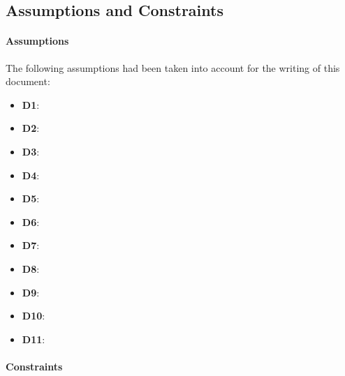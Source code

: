 \subsection{Assumptions and Constraints}

\paragraph{Assumptions}
\newcommand{\DI}{\textbf{D1}: }
\newcommand{\DII}{\textbf{D2}: }
\newcommand{\DIII}{\textbf{D3}: }
\newcommand{\DIV}{\textbf{D4}: }
\newcommand{\DV}{\textbf{D5}: }
\newcommand{\DVI}{\textbf{D6}: }
\newcommand{\DVII}{\textbf{D7}: }
\newcommand{\DVIII}{\textbf{D8}: }
\newcommand{\DIX}{\textbf{D9}: }
\newcommand{\DX}{\textbf{D10}: }
\newcommand{\DXI}{\textbf{D11}: }

The following assumptions had been taken into account for the writing of this document:
\newline\begin{itemize}
	\item  \DI
	\item  \DII
	\item  \DIII
	\item  \DIV
	\item  \DV
	\item  \DVI
	\item  \DVII
	\item  \DVIII
	\item  \DIX
	\item  \DX
	\item  \DXI
\end{itemize}

\paragraph{Constraints}

